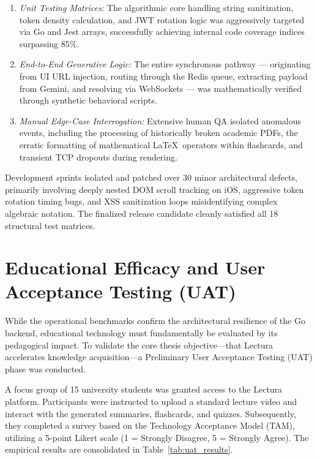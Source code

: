 \begin{enumerate}
    \item \textit{Unit Testing Matrices:} The algorithmic core handling string sanitization, token density calculation, and JWT rotation logic was aggressively targeted via Go and Jest arrays, successfully achieving internal code coverage indices surpassing 85\%.
    \item \textit{End-to-End Generative Logic:} The entire synchronous pathway — originating from UI URL injection, routing through the Redis queue, extracting payload from Gemini, and resolving via WebSockets — was mathematically verified through synthetic behavioral scripts.
    \item \textit{Manual Edge-Case Interrogation:} Extensive human QA isolated anomalous events, including the processing of historically broken academic PDFs, the erratic formatting of mathematical \LaTeX\ operators within flashcards, and transient TCP dropouts during rendering.
\end{enumerate}

Development sprints isolated and patched over 30 minor architectural defects, primarily involving deeply nested DOM scroll tracking on iOS, aggressive token rotation timing bugs, and XSS sanitization loops misidentifying complex algebraic notation. The finalized release candidate cleanly satisfied all 18 structural test matrices.

\section{Educational Efficacy and User Acceptance Testing (UAT)}
While the operational benchmarks confirm the architectural resilience of the Go backend, educational technology must fundamentally be evaluated by its pedagogical impact. To validate the core thesis objective—that Lectura accelerates knowledge acquisition—a Preliminary User Acceptance Testing (UAT) phase was conducted. 

A focus group of 15 university students was granted access to the Lectura platform. Participants were instructed to upload a standard lecture video and interact with the generated summaries, flashcards, and quizzes. Subsequently, they completed a survey based on the Technology Acceptance Model (TAM), utilizing a 5-point Likert scale (1 = Strongly Disagree, 5 = Strongly Agree). The empirical results are consolidated in Table~\ref{tab:uat_results}.

